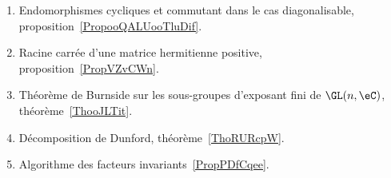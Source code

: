 
\begin{enumerate}
	\item Endomorphismes cycliques et commutant dans le cas diagonalisable, proposition~\ref{PropooQALUooTluDif}.
	\item Racine carrée d'une matrice hermitienne positive, proposition~\ref{PropVZvCWn}.
	\item Théorème de Burnside sur les sous-groupes d'exposant fini de \( \GL(n,\eC)\), théorème~\ref{ThooJLTit}.
	\item Décomposition de Dunford, théorème~\ref{ThoRURcpW}.
	\item Algorithme des facteurs invariants~\ref{PropPDfCqee}.
\end{enumerate}

